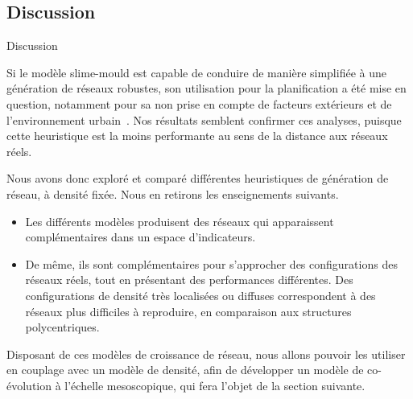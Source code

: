 %



%
%
%
%


\subsection{Discussion}{Discussion}



Si le modèle slime-mould est capable de conduire de manière simplifiée à une génération de réseaux robustes, son utilisation pour la planification a été mise en question, notamment pour sa non prise en compte de facteurs extérieurs et de l'environnement urbain~\cite{adamatzky2010road}. Nos résultats semblent confirmer ces analyses, puisque cette heuristique est la moins performante au sens de la distance aux réseaux réels.


Nous avons donc exploré et comparé différentes heuristiques de génération de réseau, à densité fixée. Nous en retirons les enseignements suivants.
\begin{itemize}
	\item Les différents modèles produisent des réseaux qui apparaissent complémentaires dans un espace d'indicateurs.
	\item De même, ils sont complémentaires pour s'approcher des configurations des réseaux réels, tout en présentant des performances différentes. Des configurations de densité très localisées ou diffuses correspondent à des réseaux plus difficiles à reproduire, en comparaison aux structures polycentriques.
\end{itemize}


\stars

Disposant de ces modèles de croissance de réseau, nous allons pouvoir les utiliser en couplage avec un modèle de densité, afin de développer un modèle de co-évolution à l'échelle mesoscopique, qui fera l'objet de la section suivante.



\stars



